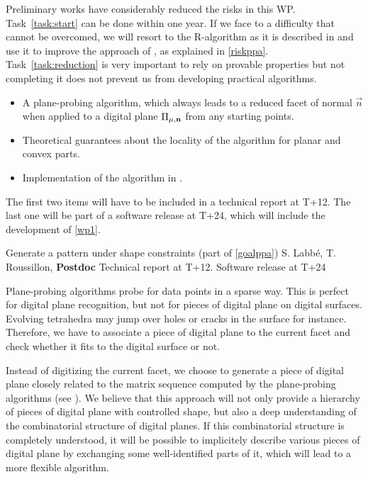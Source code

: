 \Risks
Preliminary works have considerably reduced the risks in this WP. Task~\ref{task:start}
can be done within one year. If we face to a difficulty that cannot be overcomed,
we will resort to the R-algorithm as it is described in \cite{LPRJMIV2017} and use it
to improve the approach of \citeauthor*{Charrier2011} \cite{Charrier2011}, as explained
in \ref{riskppa}. Task~\ref{task:reduction} is very important to rely on provable
properties but not completing it does not prevent us from developing practical algorithms.

\Success
\begin{itemize}
    \item A plane-probing algorithm, which always leads to a
      reduced facet of normal $\vec{n}$ when applied to a digital
      plane $\Pi_{\mu,\mathbf{n}}$ from any starting points.
    \item Theoretical guarantees about the locality of the algorithm
      for planar and convex parts.   
    \item Implementation of the algorithm in \DGtal.   
\end{itemize}
The first two items will have to be included in a technical report at T+12.
The last one will be part of a software release at T+24, which will include
the development of \ref{wp1}. 

  

\medskip
{}
   {Generate a pattern under shape constraints (part of \ref{goalppa})}
   {S. Labb\'{e}, T. Roussillon, \textbf{Postdoc}}
   {Technical report at T+12. Software release at T+24}
\medskip

Plane-probing algorithms probe for data points in a sparse way.
This is perfect for digital plane recognition, but not for pieces
of digital plane on digital surfaces. Evolving tetrahedra may jump
over holes or cracks in the surface for instance. Therefore,
we have to associate a piece of digital plane
to the current facet and check whether it fits to the digital surface
or not.

Instead of digitizing the current facet, we choose to generate a piece
of digital plane closely related to the matrix sequence computed by
the plane-probing algorithms (see ). We believe that
this approach will not only provide a hierarchy of pieces of digital
plane with controlled shape, but also a deep understanding of the
combinatorial structure of digital planes. If this combinatorial
structure is completely understood, it will be possible to implicitely
describe various pieces of digital plane by exchanging some well-identified
parts of it, which will lead to a more flexible algorithm. 

